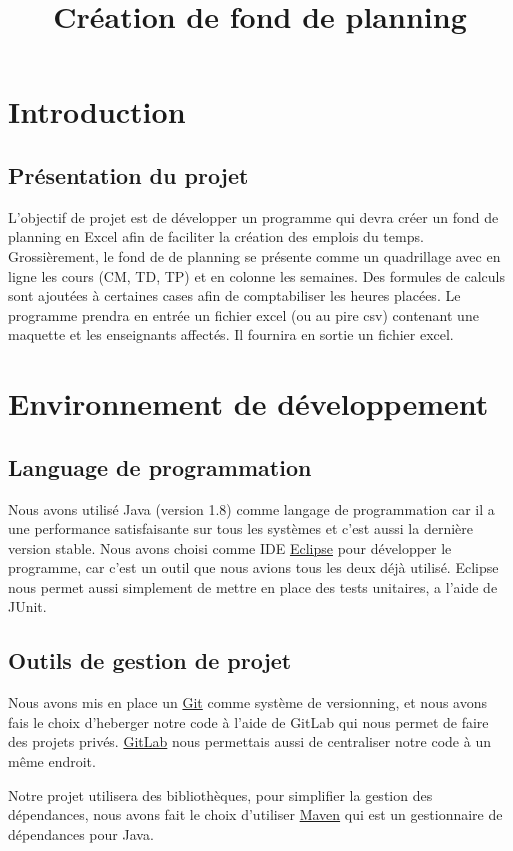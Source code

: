 \documentclass{polytech/polytech}
\title{Création de fond de planning}
\begin{document}
	\chapter{Introduction}
	\section{Présentation du projet}
	L’objectif de projet est de développer un programme qui devra créer un fond de planning en Excel afin de faciliter la création des emplois du temps.
	Grossièrement, le fond de de planning se présente comme un quadrillage avec en ligne les cours (CM, TD, TP) et en colonne les semaines.
	Des formules de calculs sont ajoutées à certaines cases afin de comptabiliser les heures placées.
	Le programme prendra en entrée un fichier excel (ou au pire csv) contenant une maquette et les enseignants affectés. Il fournira en sortie un fichier excel.

	\chapter{Environnement de développement}

	\section{Language de programmation}
	Nous avons utilisé Java (version 1.8) comme langage de programmation car il a une performance satisfaisante sur tous les systèmes et c'est aussi la dernière version stable.
	Nous avons choisi comme IDE \href{http://www.eclipse.org}{Eclipse} pour développer le programme, car c'est un outil que nous avions tous les deux déjà utilisé.
	Eclipse nous permet aussi simplement de mettre en place des tests unitaires, a l'aide de JUnit.
	\enlargethispage*{\baselineskip}
	\pagebreak
	\section{Outils de gestion de projet}

	Nous avons mis en place un \href{https://git-scm.com/}{Git} comme système de versionning, et nous avons fais le choix d'heberger notre code à l'aide de GitLab qui nous permet de faire des projets privés.
	\href{https://about.gitlab.com/}{GitLab} nous permettais aussi de centraliser notre code à un même endroit.

	Notre projet utilisera des bibliothèques, pour simplifier la gestion des dépendances, nous avons fait le choix d'utiliser \href{https://maven.apache.org/}{Maven} qui est un gestionnaire de dépendances pour Java.
\end{document}
